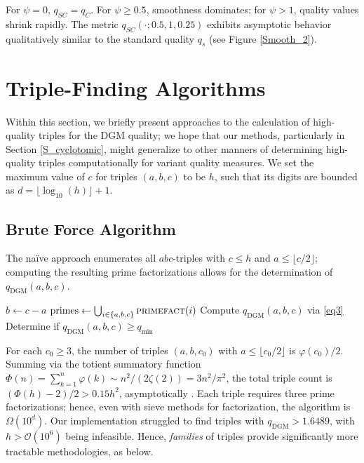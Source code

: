 \documentclass[11pt,letterpaper]{amsart}
\begin{document}
For $\psi=0$, $q_{SC}=q_C$. For $\psi\ge 0.5$, smoothness dominates; for $\psi>1$, quality values shrink rapidly. The metric $q_{SC}(\cdot;0.5,1,0.25)$ exhibits asymptotic behavior qualitatively similar to the standard quality $q_s$ (see Figure \ref{Smooth_2}).
\fi

\section{Triple-Finding Algorithms}
\label{S_Algorithms}

Within this section, we briefly present approaches to the calculation of high-quality triples for the DGM quality; we hope that our methods, particularly in Section \ref{S_cyclotomic}, might generalize to other manners of determining high-quality triples computationally for variant quality measures. We set the maximum value of $c$ for triples $(a, b, c)$ to be $h$, such that its digits are bounded as $d = \lfloor \log_{10}(h)\rfloor + 1$.

\subsection{Brute Force Algorithm}

The naïve approach enumerates all $abc$-triples with $c\le h$ and $a\le\lfloor c/2\rfloor$; computing the resulting prime factorizations allows for the determination of $q_{\text{DGM}}(a, b, c)$.

\begin{algorithm}[!t]
\caption{Brute Force Method}\label{A_Naive}
\begin{algorithmic}[1]
    \State $b\gets c-a$
    \State $\text{primes}\gets \bigcup_{i \in \{a, b, c\}} \textsc{primefact}(i)$
    \State Compute $q_{\mathrm{DGM}}(a,b,c)$ via \eqref{eq3}
    \State Determine if $q_{\mathrm{DGM}}(a, b, c)\ge q_{\min}$
  \EndFor
\EndFor
\end{algorithmic}
\end{algorithm}
For each $c_0\ge 3$, the number of triples $(a,b,c_0)$ with $a\le\lfloor c_0/2\rfloor$ is $\varphi(c_0)/2$. Summing via the totient summatory function $\Phi(n)=\sum_{k=1}^n\varphi(k)\sim n^2/(2\zeta(2))=3n^2/\pi^2$, the total triple count is $(\Phi(h)-2)/2>0.15h^2$, asymptotically \cite{hardywright}. Each triple requires three prime factorizations; hence, even with sieve methods for factorization, the algorithm is $\Omega(10^d)$. Our implementation struggled to find triples with $q_{\mathrm{DGM}} > 1.6489$, with $h > \mathcal{O}(10^6)$ being infeasible. Hence, \textit{families} of triples provide significantly more tractable methodologies, as below.
\end{document}

